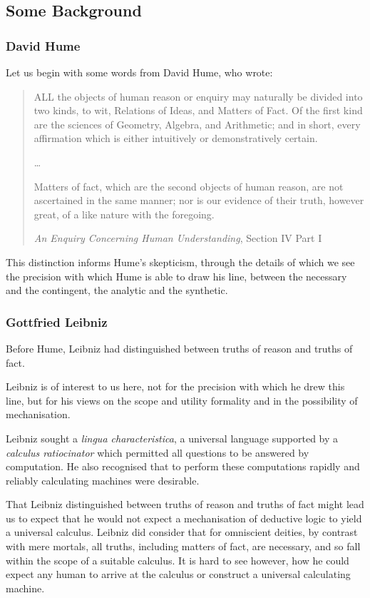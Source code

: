 \documentclass{rbjk}
\begin{document}
\begin{article}
\subsection{Some Background}


\subsubsection{David Hume}

Let us begin with some words from David Hume, who wrote:

\begin{quote}
 ALL the objects of human reason or enquiry may naturally be divided into two kinds, to wit, Relations of Ideas, and Matters of Fact. Of the first kind are the sciences of Geometry, Algebra, and Arithmetic; and in short, every affirmation which is either intuitively or demonstratively certain.

\ldots

 Matters of fact, which are the second objects of human reason, are not ascertained in the same manner; nor is our evidence of their truth, however great, of a like nature with the foregoing.

{\it An Enquiry Concerning Human Understanding}, Section IV Part I
\end{quote}

This distinction informs Hume's skepticism, through the details of which we see the precision with which Hume is able to draw his line, between the necessary and the contingent, the analytic and the synthetic.

\subsubsection{Gottfried Leibniz}

Before Hume, Leibniz had distinguished between truths of reason and truths of fact.

Leibniz is of interest to us here, not for the precision with which he drew this line, but for his views on the scope and utility formality and in the possibility of mechanisation.

Leibniz sought a {\it lingua characteristica}, a universal language supported by a {\it calculus ratiocinator} which permitted all questions to be answered by computation.
He also recognised that to perform these computations rapidly and reliably calculating machines were desirable.

That Leibniz distinguished between truths of reason and truths of fact might lead us to expect that he would not expect a mechanisation of deductive logic to yield a universal calculus.
Leibniz did consider that for omniscient deities, by contrast with mere mortals, all truths, including matters of fact, are necessary, and so fall within the scope of a suitable calculus.
It is hard to see however, how he could expect any human to arrive at the calculus or construct a universal calculating machine.


\end{article}
\end{document}
